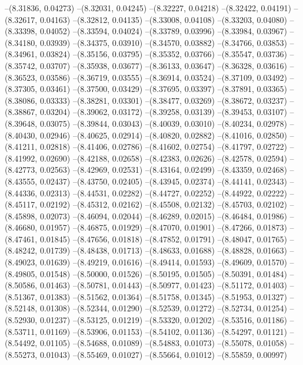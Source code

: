 --(8.31836, 0.04273)
--(8.32031, 0.04245)
--(8.32227, 0.04218)
--(8.32422, 0.04191)
--(8.32617, 0.04163)
--(8.32812, 0.04135)
--(8.33008, 0.04108)
--(8.33203, 0.04080)
--(8.33398, 0.04052)
--(8.33594, 0.04024)
--(8.33789, 0.03996)
--(8.33984, 0.03967)
--(8.34180, 0.03939)
--(8.34375, 0.03910)
--(8.34570, 0.03882)
--(8.34766, 0.03853)
--(8.34961, 0.03824)
--(8.35156, 0.03795)
--(8.35352, 0.03766)
--(8.35547, 0.03736)
--(8.35742, 0.03707)
--(8.35938, 0.03677)
--(8.36133, 0.03647)
--(8.36328, 0.03616)
--(8.36523, 0.03586)
--(8.36719, 0.03555)
--(8.36914, 0.03524)
--(8.37109, 0.03492)
--(8.37305, 0.03461)
--(8.37500, 0.03429)
--(8.37695, 0.03397)
--(8.37891, 0.03365)
--(8.38086, 0.03333)
--(8.38281, 0.03301)
--(8.38477, 0.03269)
--(8.38672, 0.03237)
--(8.38867, 0.03204)
--(8.39062, 0.03172)
--(8.39258, 0.03139)
--(8.39453, 0.03107)
--(8.39648, 0.03075)
--(8.39844, 0.03043)
--(8.40039, 0.03010)
--(8.40234, 0.02978)
--(8.40430, 0.02946)
--(8.40625, 0.02914)
--(8.40820, 0.02882)
--(8.41016, 0.02850)
--(8.41211, 0.02818)
--(8.41406, 0.02786)
--(8.41602, 0.02754)
--(8.41797, 0.02722)
--(8.41992, 0.02690)
--(8.42188, 0.02658)
--(8.42383, 0.02626)
--(8.42578, 0.02594)
--(8.42773, 0.02563)
--(8.42969, 0.02531)
--(8.43164, 0.02499)
--(8.43359, 0.02468)
--(8.43555, 0.02437)
--(8.43750, 0.02405)
--(8.43945, 0.02374)
--(8.44141, 0.02343)
--(8.44336, 0.02313)
--(8.44531, 0.02282)
--(8.44727, 0.02252)
--(8.44922, 0.02222)
--(8.45117, 0.02192)
--(8.45312, 0.02162)
--(8.45508, 0.02132)
--(8.45703, 0.02102)
--(8.45898, 0.02073)
--(8.46094, 0.02044)
--(8.46289, 0.02015)
--(8.46484, 0.01986)
--(8.46680, 0.01957)
--(8.46875, 0.01929)
--(8.47070, 0.01901)
--(8.47266, 0.01873)
--(8.47461, 0.01845)
--(8.47656, 0.01818)
--(8.47852, 0.01791)
--(8.48047, 0.01765)
--(8.48242, 0.01739)
--(8.48438, 0.01713)
--(8.48633, 0.01688)
--(8.48828, 0.01663)
--(8.49023, 0.01639)
--(8.49219, 0.01616)
--(8.49414, 0.01593)
--(8.49609, 0.01570)
--(8.49805, 0.01548)
--(8.50000, 0.01526)
--(8.50195, 0.01505)
--(8.50391, 0.01484)
--(8.50586, 0.01463)
--(8.50781, 0.01443)
--(8.50977, 0.01423)
--(8.51172, 0.01403)
--(8.51367, 0.01383)
--(8.51562, 0.01364)
--(8.51758, 0.01345)
--(8.51953, 0.01327)
--(8.52148, 0.01308)
--(8.52344, 0.01290)
--(8.52539, 0.01272)
--(8.52734, 0.01254)
--(8.52930, 0.01237)
--(8.53125, 0.01219)
--(8.53320, 0.01202)
--(8.53516, 0.01186)
--(8.53711, 0.01169)
--(8.53906, 0.01153)
--(8.54102, 0.01136)
--(8.54297, 0.01121)
--(8.54492, 0.01105)
--(8.54688, 0.01089)
--(8.54883, 0.01073)
--(8.55078, 0.01058)
--(8.55273, 0.01043)
--(8.55469, 0.01027)
--(8.55664, 0.01012)
--(8.55859, 0.00997)
